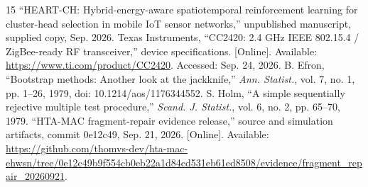 \documentclass[journal,10pt]{IEEEtran}
\begin{document}
\begin{thebibliography}{15}
 ``HEART-CH: Hybrid-energy-aware spatiotemporal reinforcement learning for cluster-head selection in mobile IoT sensor networks,'' unpublished manuscript, supplied copy, Sep. 2026.
 Texas Instruments, ``CC2420: 2.4 GHz IEEE 802.15.4 / ZigBee-ready RF transceiver,'' device specifications. [Online]. Available: \url{https://www.ti.com/product/CC2420}. Accessed: Sep. 24, 2026.
 B. Efron, ``Bootstrap methods: Another look at the jackknife,'' \emph{Ann. Statist.}, vol. 7, no. 1, pp. 1--26, 1979, doi: 10.1214/aos/1176344552.
 S. Holm, ``A simple sequentially rejective multiple test procedure,'' \emph{Scand. J. Statist.}, vol. 6, no. 2, pp. 65--70, 1979.
 ``HTA-MAC fragment-repair evidence release,'' source and simulation artifacts, commit 0e12c49, Sep. 21, 2026. [Online]. Available: \url{https://github.com/thomvs-dev/hta-mac-ehwsn/tree/0e12c49b9f554cb0eb22a1d84cd531eb61ed8508/evidence/fragment_repair_20260921}.
\end{thebibliography}
\end{document}
